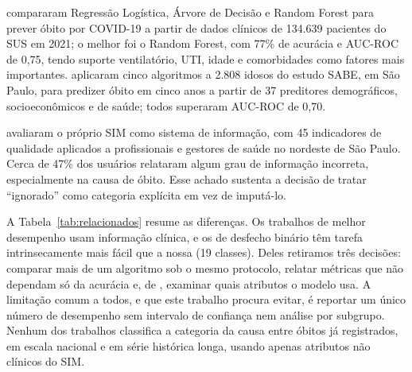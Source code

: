 \documentclass[12pt]{article}
\begin{document}
\cite{silva2022} compararam Regressão Logística, Árvore de Decisão e Random Forest para prever óbito por COVID-19 a partir de dados clínicos de 134.639 pacientes do SUS em 2021; o melhor foi o Random Forest, com 77\% de acurácia e AUC-ROC de 0,75, tendo suporte ventilatório, UTI, idade e comorbidades como fatores mais importantes. \cite{santos2019} aplicaram cinco algoritmos a 2.808 idosos do estudo SABE, em São Paulo, para predizer óbito em cinco anos a partir de 37 preditores demográficos, socioeconômicos e de saúde; todos superaram AUC-ROC de 0,70.

\cite{morais2017} avaliaram o próprio SIM como sistema de informação, com 45 indicadores de qualidade aplicados a profissionais e gestores de saúde no nordeste de São Paulo. Cerca de 47\% dos usuários relataram algum grau de informação incorreta, especialmente na causa de óbito. Esse achado sustenta a decisão de tratar ``ignorado'' como categoria explícita em vez de imputá-lo.

A Tabela~\ref{tab:relacionados} resume as diferenças. Os trabalhos de melhor desempenho usam informação clínica, e os de desfecho binário têm tarefa intrinsecamente mais fácil que a nossa (19 classes). Deles retiramos três decisões: comparar mais de um algoritmo sob o mesmo protocolo, relatar métricas que não dependam só da acurácia e, de \cite{silva2022}, examinar quais atributos o modelo usa. A limitação comum a todos, e que este trabalho procura evitar, é reportar um único número de desempenho sem intervalo de confiança nem análise por subgrupo. Nenhum dos trabalhos classifica a categoria da causa entre óbitos já registrados, em escala nacional e em série histórica longa, usando apenas atributos não clínicos do SIM.

\begin{table}[ht]
\centering
\caption{Comparação com os trabalhos relacionados.}
\label{tab:relacionados}
\end{table}
\end{document}
